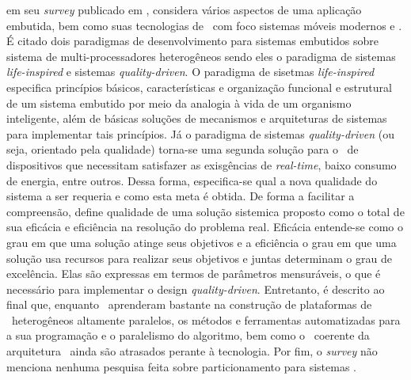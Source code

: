 	\cite{Jozwiak2017} em seu \textit{survey} publicado em \cite{Jozwiak2017}, considera vários aspectos de uma aplicação embutida, bem como suas tecnologias de \design\ com foco sistemas móveis modernos e \wearables.
	É citado dois paradigmas de desenvolvimento para sistemas embutidos sobre sistema de multi-processadores heterogêneos sendo eles o paradigma de sistemas \textit{life-inspired} e sistemas \textit{quality-driven}. O paradigma de sisetmas \textit{life-inspired} especifica princípios básicos, características e organização funcional e estrutural de um sistema embutido por meio da analogia à vida de um organismo inteligente, além de básicas soluções de mecanismos e arquiteturas de sistemas para implementar tais princípios. Já o paradigma de sistemas \textit{quality-driven} (ou seja, orientado pela qualidade) torna-se uma segunda solução para o \design\ de dispositivos que necessitam satisfazer as exisgências de \textit{real-time}, baixo consumo de energia, entre outros. Dessa forma, especifica-se qual a nova qualidade do sistema a ser requeria e como esta meta é obtida. De forma a facilitar a compreensão, \cite{Jozwiak2017} define qualidade de uma solução sistemica proposto como o total de sua eficácia e eficiência na resolução do problema real. Eficácia entende-se como o grau em que uma solução atinge seus objetivos e a eficiência o grau em que uma solução usa recursos para realizar seus objetivos e juntas determinam o grau de excelência. Elas são expressas em termos de parâmetros mensuráveis, o que é necessário para implementar o design \textit{quality-driven}. Entretanto, é descrito ao final que, enquanto \designers\ aprenderam bastante na construção de plataformas de \hardware\ heterogêneos altamente paralelos, os métodos e ferramentas automatizadas para a sua programação e o paralelismo do algoritmo, bem como o \codesign\ coerente da arquitetura \hs\ ainda são atrasados perante à tecnologia.
	Por fim, o \textit{survey} não menciona nenhuma pesquisa feita sobre particionamento para sistemas \wearables.
